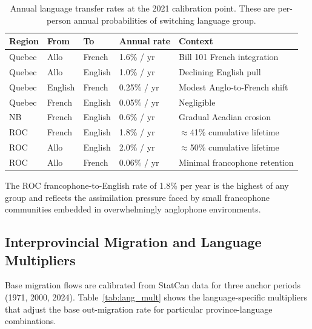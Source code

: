 \documentclass[11pt,a4paper]{article}
\begin{document}
\begin{table}[H]
\centering
\caption{Annual language transfer rates at the 2021 calibration point.
         These are per-person annual probabilities of switching language group.}
\label{tab:lt}
\vspace{4pt}
\begin{tabular}{L{2cm} L{1.5cm} L{1.5cm} C{2.5cm} L{5.5cm}}
\toprule
\textbf{Region} & \textbf{From} & \textbf{To} & \textbf{Annual rate} & \textbf{Context} \\
\midrule
Quebec & Allo & French & 1.6\% / yr & Bill 101 French integration \\
Quebec & Allo & English & 1.0\% / yr & Declining English pull \\
Quebec & English & French & 0.25\% / yr & Modest Anglo-to-French shift \\
Quebec & French & English & 0.05\% / yr & Negligible \\
\addlinespace
NB & French & English & 0.6\% / yr & Gradual Acadian erosion \\
\addlinespace
ROC & French & English & 1.8\% / yr & $\approx$41\% cumulative lifetime \\
ROC & Allo & English & 2.0\% / yr & $\approx$50\% cumulative lifetime \\
ROC & Allo & French & 0.06\% / yr & Minimal francophone retention \\
\bottomrule
\end{tabular}
\end{table}

The ROC francophone-to-English rate of 1.8\% per year is the highest of any
group and reflects the assimilation pressure faced by small francophone
communities embedded in overwhelmingly anglophone environments.

\subsection{Interprovincial Migration and Language Multipliers}

Base migration flows are calibrated from StatCan data for three anchor periods
(1971, 2000, 2024).  Table~\ref{tab:lang_mult} shows the language-specific
multipliers that adjust the base out-migration rate for particular
province-language combinations.
\end{document}
